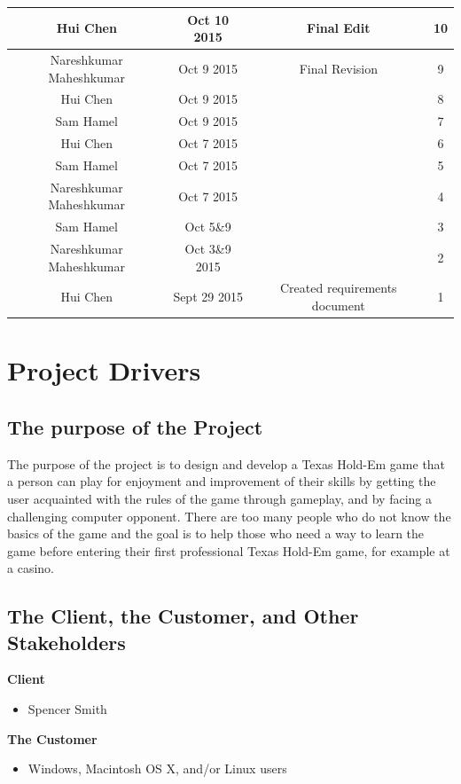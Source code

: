 \documentclass[12pt]{article}
\begin{document}
\begin{table}[H]
\begin{center}
\begin{tabular}{|| c c c c || }
	\hline
	Hui Chen & Oct 10 2015 & Final Edit & 10\\
	\hline
	Nareshkumar Maheshkumar & Oct 9 2015 & Final Revision & 9 \\
	\hline
	Hui Chen & Oct 9 2015 & & 8 \\
	\hline
	Sam Hamel & Oct 9 2015 & & 7 \\
	\hline
	Hui Chen & Oct 7 2015 & & 6 \\
	\hline
	Sam Hamel & Oct 7 2015 & & 5 \\
	\hline
	Nareshkumar Maheshkumar & Oct 7 2015 &	& 4	\\
	\hline
	Sam Hamel & Oct 5\&9 & & 3 \\
	\hline
	Nareshkumar Maheshkumar & Oct 3\&9 2015 & &2 \\
	\hline
	Hui Chen & Sept 29 2015& Created requirements document	& 1 \\
	\hline
	\end{tabular}
	\end{center}
	\end{table}
	
	\newpage
	\tableofcontents
	\listoffigures
	\listoftables

	\newpage
	\section{Project Drivers}
	\subsection{The purpose of the Project}
	The purpose of the project is to design and develop a Texas Hold-Em game that a person 		can play for enjoyment and improvement of their skills by getting the user acquainted 		with the rules of the game through gameplay, and by facing a challenging computer 			opponent. There are too many people who do not know the basics of the game and the goal 	is to help those who need a way to learn the game before entering their first 				professional Texas Hold-Em game, for example at a casino.
	\subsection{The Client, the Customer, and Other Stakeholders}
	\textbf{Client}
	\begin{itemize}
	\item Spencer Smith
	\end{itemize}
	\textbf{The Customer}
	\begin{itemize}
	\item Windows, Macintosh OS X, and/or Linux users
	\end{itemize}
	
\end{document}
